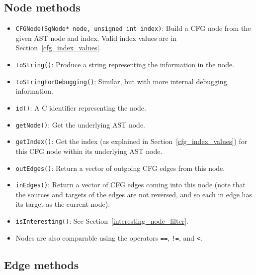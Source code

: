\subsection{Node methods}

\begin{itemize}
\item \lstinline{CFGNode(SgNode* node, unsigned int index)}: Build a CFG
node from the given AST node and index.  Valid index values are in
Section~\ref{cfg_index_values}.
\item \lstinline{toString()}: Produce a string representing the information
in the node.
\item \lstinline{toStringForDebugging()}: Similar, but with more internal
debugging information.
\item \lstinline{id()}: A C identifier representing the node.
\item \lstinline{getNode()}: Get the underlying AST node.
\item \lstinline{getIndex()}: Get the index (as explained in
Section~\ref{cfg_index_values}) for this CFG node within its underlying AST
node.
\item \lstinline{outEdges()}: Return a vector of outgoing CFG edges from
this node.
\item \lstinline{inEdges()}: Return a vector of CFG edges coming into this
node (note that the sources and targets of the edges are not reversed, and
so each in edge has its target as the current node).
\item \lstinline{isInteresting()}: See
Section~\ref{interesting_node_filter}.
\item Nodes are also comparable using the operators \lstinline{==},
\lstinline{!=}, and \lstinline{<}.
\end{itemize}

\subsection{Edge methods}

